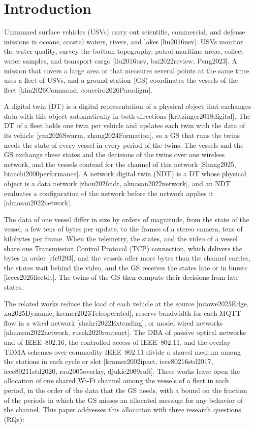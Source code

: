 \section{Introduction}\label{sec:intro}

Unmanned surface vehicles (USVs) carry out scientific, commercial, and defense missions in oceans, coastal waters, rivers, and lakes [liu2016usv]. USVs monitor the water quality, survey the bottom topography, patrol maritime areas, collect water samples, and transport cargo [liu2016usv, bai2022review, Peng2023]. A mission that covers a large area or that measures several points at the same time uses a fleet of USVs, and a ground station (GS) coordinates the vessels of the fleet [kim2026Command, couceiro2026Paradigm].

A digital twin (DT) is a digital representation of a physical object that exchanges data with this object automatically in both directions [kritzinger2018digital]. The DT of a fleet holds one twin per vehicle and updates each twin with the data of its vehicle [yan2026Swarm, zhang2024Formation], so a GS that runs the twins needs the state of every vessel in every period of the twins. The vessels and the GS exchange these states and the decisions of the twins over one wireless network, and the vessels contend for the channel of this network [Shang2025, bianchi2000performance]. A network digital twin (NDT) is a DT whose physical object is a data network [zhou2026ndt, almasan2022network], and an NDT evaluates a configuration of the network before the network applies it [almasan2022network].

The data of one vessel differ in size by orders of magnitude, from the state of the vessel, a few tens of bytes per update, to the frames of a stereo camera, tens of kilobytes per frame. When the telemetry, the states, and the video of a vessel share one Transmission Control Protocol (TCP) connection, which delivers the bytes in order [rfc9293], and the vessels offer more bytes than the channel carries, the states wait behind the video, and the GS receives the states late or in bursts [icecs2026fleetdt]. The twins of the GS then compute their decisions from late states.

The related works reduce the load of each vehicle at the source [mtowe2025Edge, xu2025Dynamic, kremer2023Teleoperated], reserve bandwidth for each MQTT flow in a wired network [shahri2022Extending], or model wired networks [almasan2022network, rusek2020routenet]. The DBA of passive optical networks and of IEEE~802.16, the controlled access of IEEE~802.11, and the overlay TDMA schemes over commodity IEEE~802.11 divide a shared medium among the stations in each cycle or slot [kramer2002ipact, ieee80216std2017, ieee80211std2020, rao2005overlay, djukic2009soft]. These works leave open the allocation of one shared Wi-Fi channel among the vessels of a fleet in each period, in the order of the data that the GS needs, with a bound on the fraction of the periods in which the GS misses an allocated message for any behavior of the channel. This paper addresses this allocation with three research questions (RQs):

